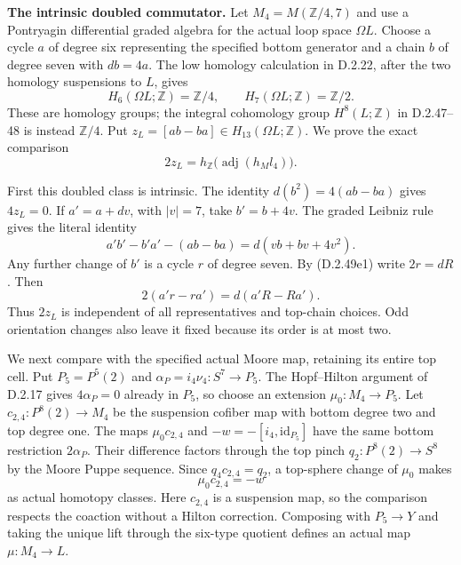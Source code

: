 \medskip\noindent
\textbf{The intrinsic doubled commutator.}
Let $M_4=M(\mathbb Z/4,7)$ and use a Pontryagin differential
graded algebra for the actual loop space $\Omega L$.  Choose a
cycle $a$ of degree six representing the specified bottom
generator and a chain $b$ of degree seven with $db=4a$.
The low homology calculation in D.2.22, after the two homology
suspensions to $L$, gives
\[
 H_6(\Omega L;\mathbb Z)=\mathbb Z/4,
 \qquad H_7(\Omega L;\mathbb Z)=\mathbb Z/2.
 \tag{D.2.49e1}
\]
These are homology groups; the integral cohomology group
$H^8(L;\mathbb Z)$ in D.2.47--48 is instead $\mathbb Z/4$.
Put $z_L=[ab-ba]\in H_{13}(\Omega L;\mathbb Z)$.  We prove
the exact comparison
\[
 2z_L=h_{\mathbb Z}\bigl(\operatorname{adj}(h_Ml_4)\bigr).
 \tag{D.2.49e2}
\]

First this doubled class is intrinsic.  The identity
$d(b^2)=4(ab-ba)$ gives $4z_L=0$.  If $a'=a+dv$, with
$|v|=7$, take $b'=b+4v$.  The graded Leibniz rule gives the
literal identity
\[
 a'b'-b'a'-(ab-ba)=d(vb+bv+4v^2).
 \tag{D.2.49e3}
\]
Any further change of $b'$ is a cycle $r$ of degree seven.
By \textup{(D.2.49e1)} write $2r=dR$.  Then
\[
                 2(a'r-ra')=d(a'R-Ra').
 \tag{D.2.49e4}
\]
Thus $2z_L$ is independent of all representatives and top-chain
choices.  Odd orientation changes also leave it fixed because
its order is at most two.

We next compare with the specified actual Moore map, retaining
its entire top cell.  Put $P_5=P^5(2)$ and
$\alpha_P=i_4\nu_4:S^7\to P_5$.  The Hopf--Hilton argument
of D.2.17 gives $4\alpha_P=0$ already in $P_5$, so choose an
extension $\mu_0:M_4\to P_5$.  Let
$c_{2,4}:P^8(2)\to M_4$ be the suspension cofiber map with
bottom degree two and top degree one.  The maps
$\mu_0c_{2,4}$ and $-w=-[i_4,\mathrm{id}_{P_5}]$ have the
same bottom restriction $2\alpha_P$.  Their difference factors
through the top pinch $q_2:P^8(2)\to S^8$ by the Moore
Puppe sequence.  Since $q_4c_{2,4}=q_2$, a top-sphere change
of $\mu_0$ makes
\[
                         \mu_0c_{2,4}=-w
 \tag{D.2.49e5}
\]
as actual homotopy classes.  Here $c_{2,4}$ is a suspension
map, so the comparison respects the coaction without a Hilton
correction.  Composing with $P_5\to Y$ and taking the unique
lift through the six-type quotient defines an actual map
$\mu:M_4\to L$.

